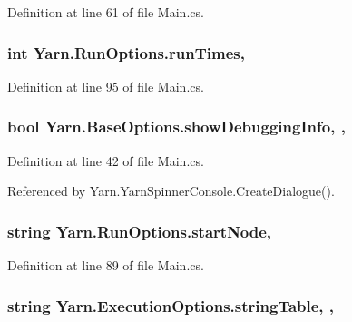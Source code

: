 Definition at line 61 of file Main.\-cs.

\hypertarget{a00144_a525bb1890b29f86002c2f163ace4a3d8}{
\subsubsection[{run\-Times}]{\setlength{\rightskip}{0pt plus 5cm}int Yarn.\-Run\-Options.\-run\-Times\hspace{0.3cm}{\ttfamily [get]}, {\ttfamily [set]}}}\label{a00144_a525bb1890b29f86002c2f163ace4a3d8}


Definition at line 95 of file Main.\-cs.

\hypertarget{a00042_a89964ea17bd19caf00cb5bff563ed01c}{
\subsubsection[{show\-Debugging\-Info}]{\setlength{\rightskip}{0pt plus 5cm}bool Yarn.\-Base\-Options.\-show\-Debugging\-Info\hspace{0.3cm}{\ttfamily [get]}, {\ttfamily [set]}, {\ttfamily [inherited]}}}\label{a00042_a89964ea17bd19caf00cb5bff563ed01c}


Definition at line 42 of file Main.\-cs.



Referenced by Yarn.\-Yarn\-Spinner\-Console.\-Create\-Dialogue().

\hypertarget{a00144_a785bd0f1c8b6674e7a1cfbe38c29b961}{
\subsubsection[{start\-Node}]{\setlength{\rightskip}{0pt plus 5cm}string Yarn.\-Run\-Options.\-start\-Node\hspace{0.3cm}{\ttfamily [get]}, {\ttfamily [set]}}}\label{a00144_a785bd0f1c8b6674e7a1cfbe38c29b961}


Definition at line 89 of file Main.\-cs.

\hypertarget{a00101_a7e43c3b73722956cb0f5d507e4eef527}{
\subsubsection[{string\-Table}]{\setlength{\rightskip}{0pt plus 5cm}string Yarn.\-Execution\-Options.\-string\-Table\hspace{0.3cm}{\ttfamily [get]}, {\ttfamily [set]}, {\ttfamily [inherited]}}}\label{a00101_a7e43c3b73722956cb0f5d507e4eef527}


